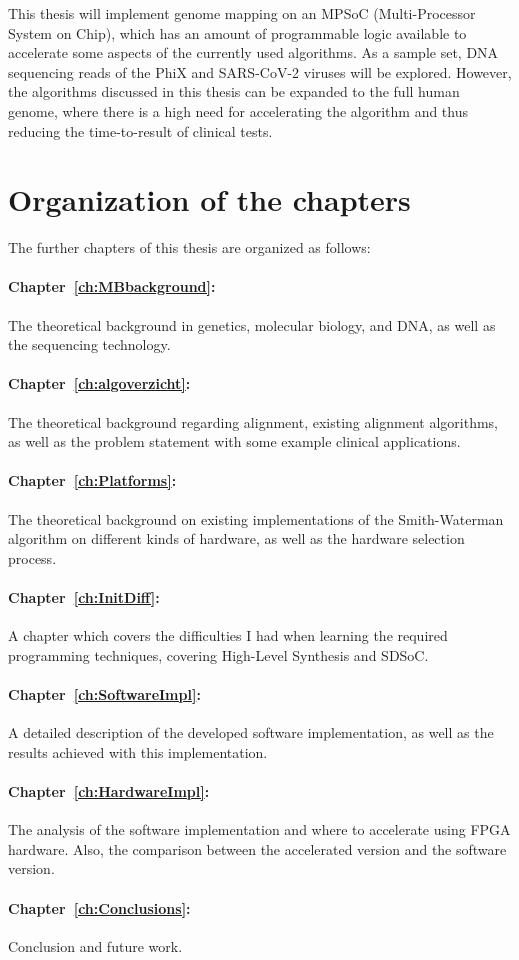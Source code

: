 This thesis will implement genome mapping on an MPSoC (Multi-Processor System on Chip), which has an amount of programmable logic available to accelerate some aspects of the currently used algorithms. As a sample set, DNA sequencing reads of the PhiX and SARS-CoV-2 viruses will be explored. However, the algorithms discussed in this thesis can be expanded to the full human genome, where there is a high need for accelerating the algorithm and thus reducing the time-to-result of clinical tests.

\section{Organization of the chapters}

The further chapters of this thesis are organized as follows:

\paragraph{Chapter~\ref{ch:MBbackground}:} The theoretical background in genetics, molecular biology, and DNA, as well as the sequencing technology.
\paragraph{Chapter~\ref{ch:algoverzicht}:} The theoretical background regarding alignment, existing alignment algorithms, as well as the problem statement with some example clinical applications.
\paragraph{Chapter~\ref{ch:Platforms}:} The theoretical background on existing implementations of the Smith-Waterman algorithm on different kinds of hardware, as well as the hardware selection process.
\paragraph{Chapter~\ref{ch:InitDiff}:} A chapter which covers the difficulties I had when learning the required programming techniques, covering High-Level Synthesis and SDSoC. 
\paragraph{Chapter~\ref{ch:SoftwareImpl}:} A detailed description of the developed software implementation, as well as the results achieved with this implementation.
\paragraph{Chapter~\ref{ch:HardwareImpl}:} The analysis of the software implementation and where to accelerate using FPGA hardware. Also, the comparison between the accelerated version and the software version.
\paragraph{Chapter~\ref{ch:Conclusions}:} Conclusion and future work.